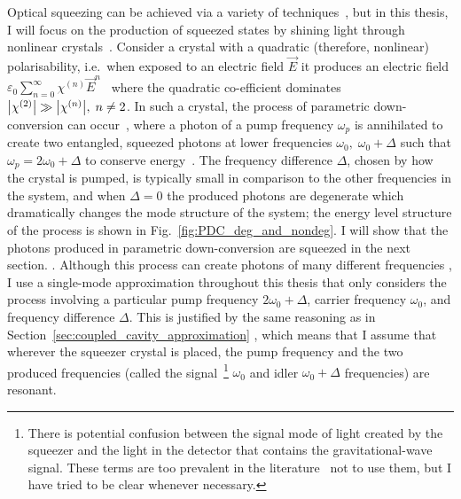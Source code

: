 Optical squeezing can be achieved via a variety of techniques~\cite{}, but in this thesis, I will focus on the production of squeezed states by shining light through nonlinear crystals~\cite{}. Consider a crystal with a quadratic (therefore, nonlinear) polarisability, i.e.\ when exposed to an electric field $\vec E$ it produces an electric field $\varepsilon_0 \sum_{n=0}^\infty \chi^{(n)} {\vec E}^n$~\cite{ ref in Kirk thesis?}  where the quadratic co-efficient dominates $\abs{\chi^{(2)}}\gg\abs{\chi^{(n)}},\; n\neq2$. In such a crystal, the process of parametric down-conversion can occur~\cite{}, where a photon of a  pump frequency $\omega_p$ is annihilated to create two entangled, squeezed photons at lower frequencies $\omega_0,\; \omega_0+\Delta$ such that $\omega_p=2\omega_0+\Delta$ to conserve energy~\cite{}. The frequency difference $\Delta$, chosen by how the crystal is pumped, is typically small in comparison to the other frequencies in the system, and when $\Delta=0$ the produced photons are degenerate which dramatically changes the mode structure of the system; the energy level structure of the process is shown in Fig.~\ref{fig:PDC_deg_and_nondeg}. I will show that the photons produced in parametric down-conversion are squeezed in the next section. %
. Although this process can create photons of many different frequencies , I use a single-mode approximation throughout this thesis that only considers the process involving a particular pump frequency $2\omega_0+\Delta$, carrier frequency $\omega_0$, and frequency difference $\Delta$. This is justified by the same reasoning as in Section~\ref{sec:coupled_cavity_approximation} , %
which means that I assume that wherever the squeezer crystal is placed, the pump frequency and the two produced frequencies (called the signal~\footnote{There is potential confusion between the signal mode of light created by the squeezer and the light in the detector that contains the gravitational-wave signal. %
These terms are too prevalent in the literature~\cite{} not to use them, but I have tried to be clear whenever necessary.} $\omega_0$ and idler $\omega_0+\Delta$ frequencies) are resonant.

